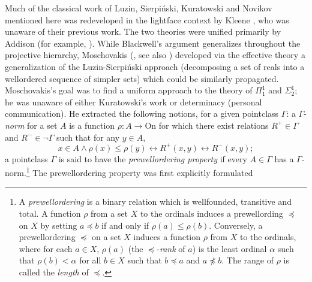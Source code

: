 \documentclass{book}%
\def\underTilde#1{{\baselineskip=0pt\vtop{\hbox{$#1$}\hbox{$\sim$}}}{}}
\newcommand{\uTPi}{\underTilde{\Pi}}
\newcommand{\uTSigma}{\underTilde{\Sigma}}
\begin{document}
Much of the classical work of Luzin, Sierpi\'{n}ski, Kuratowski and Novikov mentioned here was redeveloped in the lightface context by Kleene , who was unaware of their previous work. The two theories were unified primarily by Addison (for example, ). While Blackwell's argument generalizes throughout the projective hierarchy, Moschovakis (, see also ) developed via the effective theory a generalization of the Luzin-Sierpi\'{n}ski
approach (decomposing a set of reals into a wellordered sequence of simpler sets) which could be similarly propagated. Moschovakis's goal was to find a uniform approach to the theory of $\Pi^{1}_{1}$ and $\Sigma^{1}_{2}$;
he was unaware of either Kuratowski's work or determinacy (personal communication).
He extracted the following notions, for a
given pointclass $\Gamma$:
a $\Gamma$-\emph{norm} for a set $A$ is a function $\rho\colon A \to
\text{On}$ for which there exist relations $R^{+} \in \Gamma$ and
$R^{-} \in \neg\Gamma$ such that for any $y \in A$,
$$x \in A \wedge \rho(x) \leq \rho(y) \leftrightarrow R^{+}(x,y)
\leftrightarrow R^{-}(x,y);$$ a pointclass $\Gamma$ is said to have
the \emph{prewellordering property} if every $A \in \Gamma$ has a
$\Gamma$-norm.\footnote{A \emph{prewellordering} is a binary relation which is wellfounded, transitive and total.
A function $\rho$ from a set $X$ to the ordinals induces a prewellording $\preceq$ on $X$ by setting $a \preceq b$ if and only if $\rho(a) \leq \rho(b)$. Conversely, a prewellordering $\preceq$ on a set $X$ induces a function $\rho$ from $X$ to the ordinals, where for each $a \in X$,
$\rho(a)$ (the $\preceq$-\emph{rank} of $a$) is the least ordinal $\alpha$ such that $\rho(b) < \alpha$ for all $b \in X$ such that $b \preceq a$ and $a \not\preceq b$. The range of $\rho$ is called the \emph{length} of $\preceq$.}
The prewellordering property was first explicitly formulated
\end{document}

